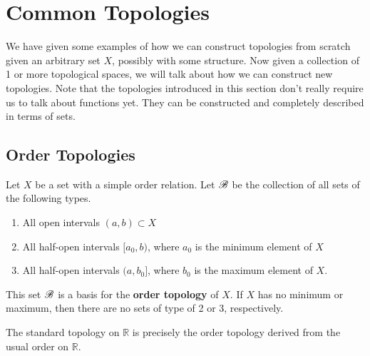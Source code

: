 \section{Common Topologies} 

  We have given some examples of how we can construct topologies from scratch given an arbitrary set $X$, possibly with some structure. Now given a collection of 1 or more topological spaces, we will talk about how we can construct new topologies. Note that the topologies introduced in this section don't really require us to talk about functions yet. They can be constructed and completely described in terms of sets. 

\subsection{Order Topologies}

  \begin{definition}
    Let $X$ be a set with a simple order relation. Let $\operatorname{\mathscr{B}}$ be the collection of all sets of the following types. 
    \begin{enumerate}
      \item All open intervals $(a, b) \subset X$
      \item All half-open intervals $[a_0, b)$, where $a_0$ is the minimum element of $X$
      \item All half-open intervals $(a, b_0]$, where $b_0$ is the maximum element of $X$. 
    \end{enumerate}
    This set $\operatorname{\mathscr{B}}$ is a basis for the \textbf{order topology} of $X$. If $X$ has no minimum or maximum, then there are no sets of type of 2 or 3, respectively. 
  \end{definition}

  \begin{example}
    The standard topology on $\mathbb{R}$ is precisely the order topology derived from the usual order on $\mathbb{R}$. 
  \end{example}

